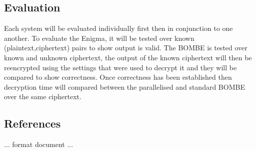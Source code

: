 \documentclass[12pt,a4paper]{article}
\begin{document}
\subsection{Evaluation}

Each system will be evaluated individually first then in conjunction to one another. To evaluate the Enigma, it will be tested over known (plaintext,ciphertext) pairs to show output is valid. The BOMBE is tested over known and unknown ciphertext, the output of the known ciphertext will then be reencrypted using the settings that were used to decrypt it and they will be compared to show correctness. Once correctness has been established then decryption time will compared between the parallelised and standard BOMBE over the same ciphertext.

\subsection{References}



...
format document
...
\end{document}
